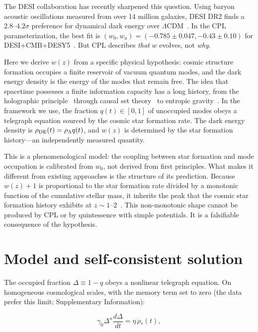 \documentclass[12pt,a4paper]{article}
\begin{document}
The DESI collaboration has recently sharpened this question. Using baryon acoustic oscillations measured from over 14 million galaxies, DESI DR2 finds a $2.8$--$4.2\sigma$ preference for dynamical dark energy over $\Lambda$CDM~\cite{desi2025}. In the CPL parameterization, the best fit is $(w_0,w_a)=(-0.785\pm0.047,-0.43\pm0.10)$ for DESI+CMB+DESY5~\cite{li2026}. But CPL describes {\it that} $w$ evolves, not {\it why}.

Here we derive $w(z)$ from a specific physical hypothesis: cosmic structure formation occupies a finite reservoir of vacuum quantum modes, and the dark energy density is the energy of the modes that remain free. The idea that spacetime possesses a finite information capacity has a long history, from the holographic principle~\cite{thooft1993,susskind1995} through causal set theory~\cite{sorkin2005} to entropic gravity~\cite{verlinde2011,jacobson1995}. In the framework we use, the fraction $q(t)\in[0,1]$ of unoccupied modes obeys a telegraph equation sourced by the cosmic star formation rate. The dark energy density is $\rho_{\rm DE}(t)=\rho_\Lambda q(t)$, and $w(z)$ is determined by the star formation history---an independently measured quantity.

This is a phenomenological model: the coupling between star formation and mode occupation is calibrated from $w_0$, not derived from first principles. What makes it different from existing approaches is the structure of its prediction. Because $w(z)+1$ is proportional to the star formation rate divided by a monotonic function of the cumulative stellar mass, it inherits the peak that the cosmic star formation history exhibits at $z\sim1$--$2$~\cite{madau2014}. This non-monotonic shape cannot be produced by CPL or by quintessence with simple potentials. It is a falsifiable consequence of the hypothesis.

\section*{Model and self-consistent solution}

The occupied fraction $\Delta\equiv1-q$ obeys a nonlinear telegraph equation. On homogeneous cosmological scales, with the memory term set to zero (the data prefer this limit; Supplementary Information):

\begin{equation}\label{eq:ode}
\gamma_0\Delta^n\frac{d\Delta}{dt} = \eta\,\dot{\rho}_*(t),
\end{equation}
\end{document}
